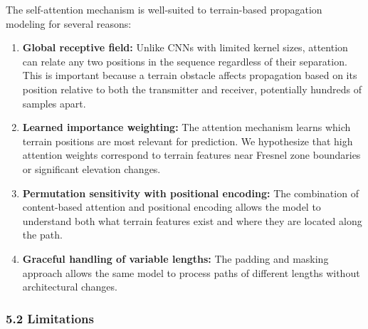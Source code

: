 \documentclass[
]{article}
\begin{document}
The self-attention mechanism is well-suited to terrain-based propagation
modeling for several reasons:

\begin{enumerate}
\def\labelenumi{\arabic{enumi}.}
\item
  \textbf{Global receptive field:} Unlike CNNs with limited kernel
  sizes, attention can relate any two positions in the sequence
  regardless of their separation. This is important because a terrain
  obstacle affects propagation based on its position relative to both
  the transmitter and receiver, potentially hundreds of samples apart.
\item
  \textbf{Learned importance weighting:} The attention mechanism learns
  which terrain positions are most relevant for prediction. We
  hypothesize that high attention weights correspond to terrain features
  near Fresnel zone boundaries or significant elevation changes.
\item
  \textbf{Permutation sensitivity with positional encoding:} The
  combination of content-based attention and positional encoding allows
  the model to understand both what terrain features exist and where
  they are located along the path.
\item
  \textbf{Graceful handling of variable lengths:} The padding and
  masking approach allows the same model to process paths of different
  lengths without architectural changes.
\end{enumerate}

\subsubsection{5.2 Limitations}\label{limitations}
\end{document}
